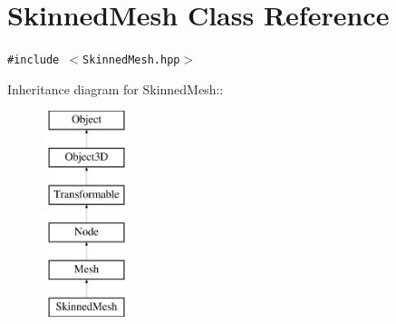 \hypertarget{classm3g_1_1SkinnedMesh}{
\section{SkinnedMesh Class Reference}
\label{classm3g_1_1SkinnedMesh}
}
{\tt \#include $<$SkinnedMesh.hpp$>$}

Inheritance diagram for SkinnedMesh::\begin{figure}[H]
\begin{center}
\leavevmode
\includegraphics[height=6cm]{classm3g_1_1SkinnedMesh}
\end{center}
\end{figure}
